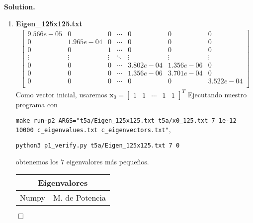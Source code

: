 \documentclass{article}
\theoremstyle{problemstyle}
\newenvironment{solution}{%
  \begin{mdframed}[linewidth=0.8pt,linecolor=Gray,backgroundcolor=Gray!5,roundcorner=5pt]%
  \noindent\textbf{Solution.}%
}{%
\hfill $ \qed $ 
  \end{mdframed}%
}
\begin{document}
\begin{solution}
\begin{enumerate}
		\item \textbf{Eigen\_125x125.txt}
		      \begin{align*}
			      \begin{bmatrix}
				      9.566e-05 & 0         & 0      & \cdots & 0         & 0         & 0         \\
				      0         & 1.965e-04 & 0      & \cdots & 0         & 0         & 0         \\
				      0         & 0         & 1      & \cdots & 0         & 0         & 0         \\
				      \vdots    & \vdots    & \vdots & \ddots & \vdots    & \vdots    & \vdots    \\
				      0         & 0         & 0      & \cdots & 3.802e-04 & 1.356e-06 & 0         \\
				      0         & 0         & 0      & \cdots & 1.356e-06 & 3.701e-04 & 0         \\
				      0         & 0         & 0      & \cdots & 0         & 0         & 3.522e-04 \\
			      \end{bmatrix}
		      \end{align*}
		      Como vector inicial, usaremos $ \mathbf{x}_0 = \begin{bmatrix}
				      1 & 1 & \cdots & 1 & 1
			      \end{bmatrix}^{T} $
		      Ejecutando nuestro programa con
		      \begin{center}
			      \texttt{make run-p2 ARGS="t5a/Eigen\_125x125.txt t5a/x0\_125.txt 7
				      1e-12 10000 c\_eigenvalues.txt c\_eigenvectors.txt"},
		      \end{center}
		      \begin{center}
			      \texttt{python3 p1\_verify.py t5a/Eigen\_125x125.txt 7 0}
		      \end{center}
		      obtenemos los 7 eigenvalores m\'as peque\~nos.
		      \begin{table}[H]
			      \begin{center}
				      \begin{tabular}{|c|c|}
					      \multicolumn{2}{c}{Eigenvalores}      \\
					      \hline
					      Numpy             & M. de Potencia    \\
					      \hline


\end{tabular}
\end{center}
\end{table}
\end{enumerate}
\end{solution}
\end{document}
